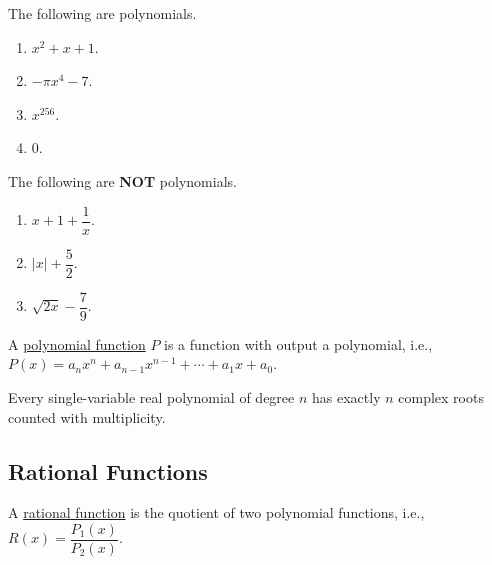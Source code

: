 \documentclass[11pt]{book}
\theoremstyle{break}
\theoremstyle{no_label}
\numberwithin{equation}{section}
\begin{document}
\begin{example}
    The following are polynomials.
    \vspace{-1em}
    \begin{multicols}{4}
        \begin{enumerate}
            \item $x^2+x+1$.
            \item $-\pi x^4-7$.
            \item $x^{256}$.
            \item $0$.
        \end{enumerate}
    \end{multicols}
    \vspace{0.1em}
\end{example}

\begin{example}
    The following are \textbf{NOT} polynomials.
    \vspace{-1em}
    \begin{multicols}{3}
        \begin{enumerate}
            \item $x+1+\dfrac{1}{x}$.
            \item $|x|+\dfrac{5}{2}$.
            \item $\sqrt{2x}-\dfrac{7}{9}$.
        \end{enumerate}
    \end{multicols}
    \vspace{0.1em}
\end{example}

\begin{definition}
    A \underline{polynomial function} $P$ is a function with output a polynomial, i.e., $P(x)=a_nx^n+a_{n-1}x^{n-1}+\cdots+a_1x+a_0$.
\end{definition}

\begin{theorem}
    Every single-variable real polynomial of degree $n$ has exactly $n$ complex roots counted with multiplicity.
\end{theorem}

\subsection*{Rational Functions}

\begin{definition}
    A \underline{rational function} is the quotient of two polynomial functions, i.e., $R(x)=\dfrac{P_1(x)}{P_2(x)}$.
\end{definition}
\end{document}
